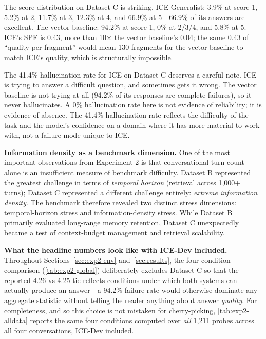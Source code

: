 \documentclass[10pt]{article}
\begin{document}
The score distribution on Dataset C is striking. ICE Generalist: 3.9\% at score 1, 5.2\% at 2, 11.7\% at 3, 12.3\% at 4, and 66.9\% at 5---66.9\% of its answers are excellent. The vector baseline: 94.2\% at score 1, 0\% at 2/3/4, and 5.8\% at 5. ICE's SPF is 0.43, more than 10$\times$ the vector baseline's 0.04; the same 0.43 of ``quality per fragment'' would mean 130 fragments for the vector baseline to match ICE's quality, which is structurally impossible.

The 41.4\% hallucination rate for ICE on Dataset C deserves a careful note. ICE is trying to answer a difficult question, and sometimes gets it wrong. The vector baseline is not trying at all (94.2\% of its responses are complete failures), so it never hallucinates. A 0\% hallucination rate here is not evidence of reliability; it is evidence of absence. The 41.4\% hallucination rate reflects the difficulty of the task and the model's confidence on a domain where it has more material to work with, not a failure mode unique to ICE.

\textbf{Information density as a benchmark dimension.} One of the most important observations from Experiment 2 is that conversational turn count alone is an insufficient measure of benchmark difficulty. Dataset B represented the greatest challenge in terms of \emph{temporal horizon} (retrieval across 1{,}000+ turns); Dataset C represented a different challenge entirely: \emph{extreme information density}. The benchmark therefore revealed two distinct stress dimensions: temporal-horizon stress and information-density stress. While Dataset B primarily evaluated long-range memory retention, Dataset C unexpectedly became a test of context-budget management and retrieval scalability.

\textbf{What the headline numbers look like with ICE-Dev included.} Throughout Sections~\ref{sec:exp2-env} and~\ref{sec:results}, the four-condition comparison (\cref{tab:exp2-global}) deliberately excludes Dataset C so that the reported 4.26-vs-4.25 tie reflects conditions under which both systems can actually produce an answer---a 94.2\% failure rate would otherwise dominate any aggregate statistic without telling the reader anything about answer \emph{quality}. For completeness, and so this choice is not mistaken for cherry-picking, \cref{tab:exp2-alldata} reports the same four conditions computed over \emph{all} 1{,}211 probes across all four conversations, ICE-Dev included.
\end{document}
